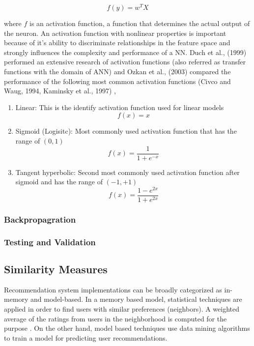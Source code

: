 \documentclass[12pt]{article}
\begin{document}
\begin{equation}
f(y) = w^{T}  X 
\end{equation}

where $f$ is an activation function, a function that determines the actual output of the neuron. An activation function with nonlinear properties is important because of it's ability to discriminate relationships in the feature space and strongly influences the complexity and performance of a NN.  Duch et al., (1999) \cite{duch} performed an extensive research of activation functions (also referred as transfer functions with the domain of ANN) and Ozkan et al., (2003) \cite{ozkan} compared the performance of the following most common activation functions (Civco and Waug, 1994, Kaminsky et al., 1997) \cite{civco}, \cite{kaminsky}
\begin{enumerate}
	\item Linear: This is the identify activation function used for linear models
	\begin{equation}
	f(x) = x
	\end{equation}
	\item Sigmoid (Logisitc): Most commonly used activation function that has the range of $(0, 1)$
	\begin{equation}
	f(x) = \frac{1}{1 + e^{-x}}
	\end{equation}
	\item Tangent hyperbolic: Second most commonly used activation function after sigmoid and has the range of $(-1, +1)$
	\begin{equation}
	f(x) = \frac{1 - e^{2x}}{1 + e^{2x}}
	\end{equation}
\end{enumerate}

\subsubsection{Backpropagration}
\subsubsection{Testing and Validation}

\subsection{Similarity Measures}

Recommendation system implementations can be broadly categorized as in-memory and model-based. In a memory based model, statistical techniques are applied in order to find users with similar preferences (neighbors). A weighted average of the ratings from users in the neighborhood is computed for the purpose \cite{carrillo}. On the other hand, model based techniques use data mining algorithms to train a model for predicting user recommendations.
\end{document}
